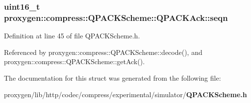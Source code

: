 \subsubsection[{seqn}]{\setlength{\rightskip}{0pt plus 5cm}uint16\+\_\+t proxygen\+::compress\+::\+Q\+P\+A\+C\+K\+Scheme\+::\+Q\+P\+A\+C\+K\+Ack\+::seqn}\label{structproxygen_1_1compress_1_1QPACKScheme_1_1QPACKAck_a292d2aa12dfa4216fb921d956eed030e}


Definition at line 45 of file Q\+P\+A\+C\+K\+Scheme.\+h.



Referenced by proxygen\+::compress\+::\+Q\+P\+A\+C\+K\+Scheme\+::decode(), and proxygen\+::compress\+::\+Q\+P\+A\+C\+K\+Scheme\+::get\+Ack().



The documentation for this struct was generated from the following file\+:\begin{DoxyCompactItemize}
\item 
proxygen/lib/http/codec/compress/experimental/simulator/{\bf Q\+P\+A\+C\+K\+Scheme.\+h}\end{DoxyCompactItemize}
